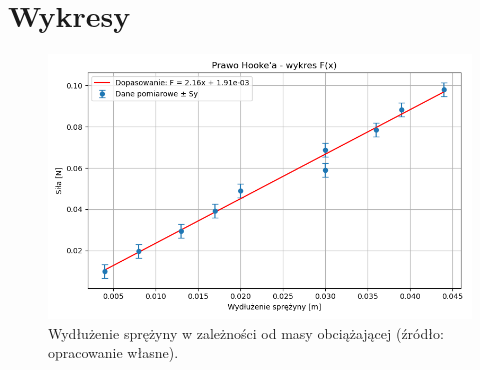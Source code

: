 \documentclass[a4paper,12pt]{article}
\begin{document}
\section{Wykresy}

\begin{figure}[H]
    \centering
    \includegraphics[width=0.9\textheight,angle=90]{Wykres_prosta_regresji_cw30.png}
    \caption{Wydłużenie sprężyny w zależności od masy obciążającej (źródło: opracowanie własne).}
    \label{fig:wykres}
\end{figure}




\end{document}
